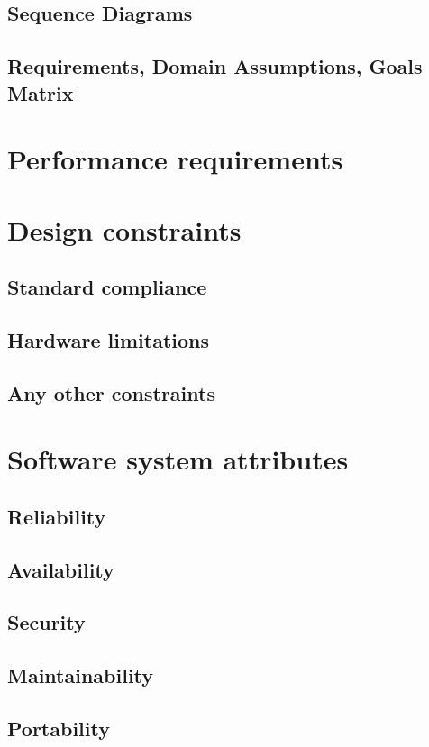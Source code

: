 \documentclass[../RASD.tex]{subfiles}
\begin{document}
            \subsection{Sequence Diagrams}\label{subsec:sequence-diagrams}
            \subsection{Requirements, Domain Assumptions, Goals Matrix}\label{subsec:requirements,-domain-assumptions,-goals-matrix}
        \section{Performance requirements}\label{sec:performance-requirements}
        \section{Design constraints}\label{sec:design-constraints}
            \subsection{Standard compliance}\label{subsec:standard-compliance}
            \subsection{Hardware limitations}\label{subsec:hardware-limitations}
            \subsection{Any other constraints}\label{subsec:any-other-constraints}
        \section{Software system attributes}\label{sec:software-system-attributes}
            \subsection{Reliability}\label{subsec:reliability}
            \subsection{Availability}\label{subsec:availability}
            \subsection{Security}\label{subsec:security}
            \subsection{Maintainability}\label{subsec:maintainability}
            \subsection{Portability}\label{subsec:portability}
\end{document}
